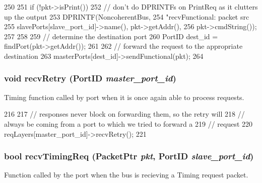 \begin{DoxyCode}
250 {
251     if (!pkt->isPrint()) {
252         // don't do DPRINTFs on PrintReq as it clutters up the output
253         DPRINTF(NoncoherentBus,
254                 "recvFunctional: packet src %
255                 slavePorts[slave_port_id]->name(), pkt->getAddr(),
256                 pkt->cmdString());
257     }
258 
259     // determine the destination port
260     PortID dest_id = findPort(pkt->getAddr());
261 
262     // forward the request to the appropriate destination
263     masterPorts[dest_id]->sendFunctional(pkt);
264 }
\end{DoxyCode}
\hypertarget{classNoncoherentBus_a96f9cd33bfb9a8b7fb2b25078eaf75a1}{
\subsubsection[{recvRetry}]{\setlength{\rightskip}{0pt plus 5cm}void recvRetry ({\bf PortID} {\em master\_\-port\_\-id})}}
\label{classNoncoherentBus_a96f9cd33bfb9a8b7fb2b25078eaf75a1}
Timing function called by port when it is once again able to process requests. 


\begin{DoxyCode}
216 {
217     // responses never block on forwarding them, so the retry will
218     // always be coming from a port to which we tried to forward a
219     // request
220     reqLayers[master_port_id]->recvRetry();
221 }
\end{DoxyCode}
\hypertarget{classNoncoherentBus_a8e2d7ccc3adb605e763f2bd1c64e5128}{
\subsubsection[{recvTimingReq}]{\setlength{\rightskip}{0pt plus 5cm}bool recvTimingReq ({\bf PacketPtr} {\em pkt}, \/  {\bf PortID} {\em slave\_\-port\_\-id})}}
\label{classNoncoherentBus_a8e2d7ccc3adb605e763f2bd1c64e5128}
Function called by the port when the bus is recieving a Timing request packet. 


